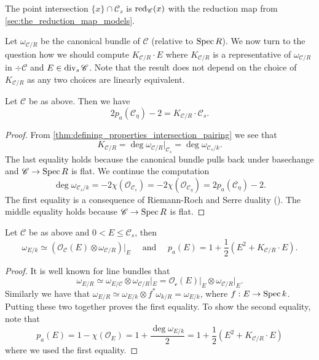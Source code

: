 \begin{remark}
	The point intersection $\{x\}  \cap \mathscr C_s$ is $\operatorname{red}_{\mathscr C}(x)$ with the reduction map from \cref{sec:the_reduction_map_models}. 
\end{remark}

Let $\omega_{\mathscr C / R} $ be the canonical bundle of $\mathscr C$ (relative to $\operatorname{Spec} R$).
We now turn to the question how we should compute $K_{\mathscr C / R} \cdot E$ where  $K_{\mathscr C / R}$ is a representative of $\omega_{\mathscr C / R}$ in $\div \mathscr C$ and $E \in \operatorname{div}_s \mathscr C$. 
Note that the result does not depend on the choice of $K_{\mathscr C / R}$ as any two choices are linearly equivalent. 

\begin{proposition}\label{prop:intersection_canonical_special}
	Let $\mathscr C$ be as above. 
	Then we have \[
		2p_a(\mathscr C_\eta) - 2 = K_{\mathscr C / R} \cdot \mathscr C_s  
	.\] 
\end{proposition}
\begin{proof}
	From \cref{thm:defining_properties_intersection_pairing} we see that \[
		K_{\mathscr C / R} = \deg \omega_{\mathscr C / R}|_{\mathscr C_s} = \deg \omega _{\mathscr C_s / k}
	.\] 
	The last equality holds because the canonical bundle pulls back under basechange and $\mathscr C \to \operatorname{Spec} R$ is flat. 
	We continue the computation \[
		\deg \omega_{\mathscr C_s / k} = - 2\chi (\mathcal{O}_{\mathscr C_s}) = -2 \chi (\mathcal{O}_{\mathscr C_\eta}) = 2p_a(\mathscr C_\eta) - 2
	.\] 
	The first equality is a consequence of Riemann-Roch and Serre duality (\cite[cor.\ 7.3.31]{liuAlgebraicGeometryArithmetic2002}).
	The middle equality holds because $\mathscr C \to \operatorname{Spec} R$ is flat. 
\end{proof}

\begin{theorem}\label{thm:adjunction_formula}
	Let $\mathscr C$ be as above and $0 < E \le \mathscr C_s$, then \[
		\omega_{E / k} \simeq (\mathcal{O}_{\mathscr C}(E) \otimes \omega_{\mathscr C / R})|_E \quad \text{ and } \quad p_a(E) = 1 + \frac{1}{2}(E^2 + K_{\mathscr C / R}\cdot E)
	.\] 
\end{theorem}
\begin{proof}
	It is well known for line bundles that \[
		\omega_{E / R} \simeq \omega_{E / \mathscr C} \otimes \omega_{\mathscr C / R}|_{E} = \mathcal{O}_{\mathscr c}(E)|_E \otimes \omega_{\mathscr C / R}|_E
	.\]
	Similarly we have that $\omega_{E / R} \simeq \omega_{E / k} \otimes  f^*\omega_{k / R}= \omega_{E / k}$, where $f: E \to \operatorname{Spec} k$. 
	Putting these two together proves the first equality.
	To show the second equality, note that \[
		p_a(E) = 1 - \chi(\mathcal{O}_E) = 1  + \frac{\deg \omega_{E / k}}{2} = 1 + \frac{1}{2}\left(E^2 + K_{\mathscr C / R} \cdot E\right)
	\] 
	where we used the first equality. 
\end{proof}

